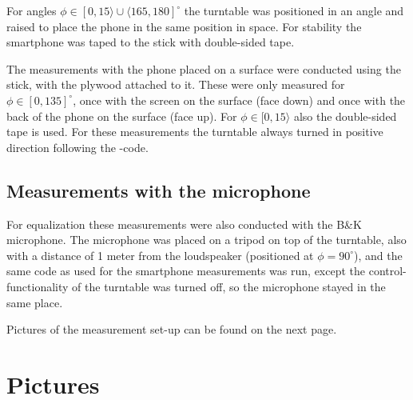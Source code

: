 For angles $\phi \in[0,15\rangle\cup\langle165,180]^\circ$ the turntable was positioned in an angle and raised to place the phone in the same position in space.
For stability the smartphone was taped to the stick with double-sided tape.

The measurements with the phone placed on a surface were conducted using the stick, with the plywood attached to it.
These were only measured for $\phi\in[0,135]^\circ$, once with the screen on the surface (face down) and once with the back of the phone on the surface (face up). For $\phi \in[0,15\rangle$ also the double-sided tape is used.
For these measurements the turntable always turned in positive direction following the \matlab-code.

\subsection{Measurements with the microphone}
For equalization these measurements were also conducted with the B\&K microphone.
The microphone was placed on a tripod on top of the turntable, also with a distance of 1 meter from the loudspeaker (positioned at $\phi=90^\circ$), and the same code as used for the smartphone measurements was run, except the control-functionality of the turntable was turned off, so the microphone stayed in the same place.

\vspace{0.5in}

Pictures of the measurement set-up can be found on the next page.

\clearpage
\section{Pictures}
